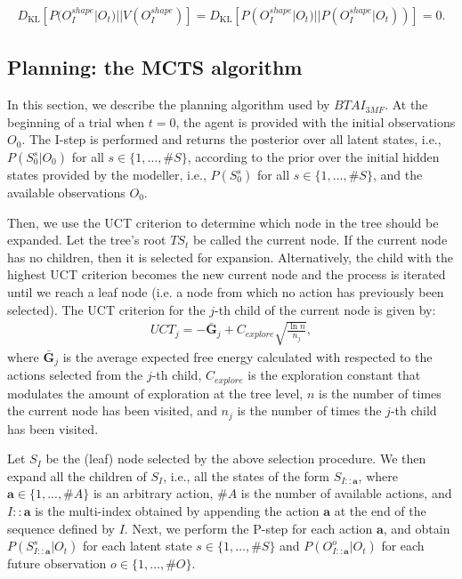 \documentclass[twoside,11pt]{article}
\newcommand{\nb}[1]{\# #1}
\begin{document}
\begin{align*}
D_{\mathrm{KL}}[P(O_I^{shape}|O_t)||V(O_I^{shape})] = D_{\mathrm{KL}}[P(O_I^{shape}|O_t)||P(O_I^{shape}|O_t))] = 0.
\end{align*}

\subsection{Planning: the MCTS algorithm} \label{ssec:planning}

In this section, we describe the planning algorithm used by $BTAI_{3MF}$. At the beginning of a trial when $t = 0$, the agent is provided with the initial observations $O_0$. The I-step is performed and returns the posterior over all latent states, i.e., $P(S_0^s|O_0)$ for all $s \in \{1, \hdots, \nb{S}\}$, according to the prior over the initial hidden states provided by the modeller, i.e., $P(S_0^s)$ for all $s \in \{1, \hdots, \nb{S}\}$, and the available observations $O_0$. 

Then, we use the UCT criterion to determine which node in the tree should be expanded. Let the tree's root $TS_t$ be called the current node. If the current node has no children, then it is selected for expansion. Alternatively, the child with the highest UCT criterion becomes the new current node and the process is iterated until we reach a leaf node (i.e. a node from which no action has previously been selected). The UCT criterion \citep{MCTS} for the $j$-th child of the current node is given by:
\begin{align}\label{eq:UCT}
UCT_j = - \bar{\bm{G}}_j + C_{explore} \sqrt{\frac{\ln n}{n_j}},
\end{align}
where $\bar{\bm{G}}_j$ is the average expected free energy calculated with respected to the actions selected from the $j$-th child, $C_{explore}$ is the exploration constant that modulates the amount of exploration at the tree level, $n$ is the number of times the current node has been visited, and $n_j$ is the number of times the $j$-th child has been visited. 

Let $S_I$ be the (leaf) node selected by the above selection procedure. We then expand all the children of $S_I$, i.e., all the states of the form $S_{I{::}\bm{a}}$, where $\bm{a} \in \{1, ..., \nb{A}\}$ is an arbitrary action, $\nb{A}$ is the number of available actions, and $I{::}\bm{a}$ is the multi-index obtained by appending the action $\bm{a}$ at the end of the sequence defined by $I$. Next, we perform the P-step for each action $\bm{a}$, and obtain $P(S_{I{::}\bm{a}}^s|O_t)$ for each latent state $s \in \{1, \hdots, \nb{S}\}$ and $P(O_{I{::}\bm{a}}^o|O_t)$ for each future observation $o \in \{1, \hdots, \nb{O}\}$.
\end{document}
